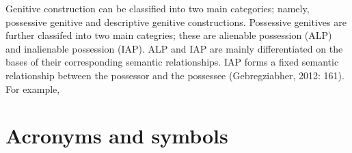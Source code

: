 \documentclass[11pt,a4paper]{article}
\begin{document}
	Genitive construction can be classified into two main categories; namely, possessive genitive and descriptive
	genitive constructions. Possessive genitives are further classifed into two main categries; these are alienable possession (ALP)
	and inalienable possession (IAP). ALP and IAP are mainly differentiated on the bases 
	of their corresponding semantic relationships. IAP forms a fixed semantic relationship between the possessor and the possessee (Gebregziabher, 2012: 161). For example,
	
	\newpage
	
	
	
	\newpage
	\section*{Acronyms and symbols}
	
\end{document}
